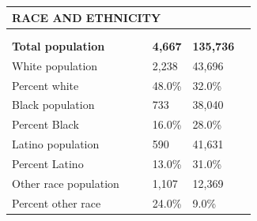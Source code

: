 \documentclass[9pt]{report}
\begin{document}
\vspace{12pt}
\setlength{\tabcolsep}{.01in} %
\begin{tabular}{p{.10in}p{.10in}p{.10in}p{3.7in}>{\hfill}p{.85in}>{\hfill}p{.85in}>{\hfill}p{.85in}>{\hfill}p{.85in}p{0.1in}}
\multicolumn{9}{l}{\parbox{7.1in}{\raggedright{\large{\strut\textbf{RACE AND ETHNICITY}\strut}}}} \\ 
\hline
\multicolumn{4}{l}{\parbox{3.5in}{\raggedright{\textbf{}}}} & \multicolumn{1}{r}{\parbox{.85in}{\strut\raggedleft{\textbf{}\strut}}} & \multicolumn{1}{r}{\parbox{.85in}{\strut\raggedleft{\textbf{}\strut}}} & \multicolumn{1}{r}{\parbox{.85in}{\strut{}}} & \multicolumn{1}{r}{\parbox{.85in}{\strut{}}} & \\ 
\multicolumn{9}{l}{} \\ 
\multicolumn{4}{l}{\parbox{3.5in}{\strut\raggedright{\textbf{Total population}\strut}}} & \textbf{} & \textbf{} & \textbf{4,667} & \textbf{135,736} & \textbf{} \\ 
\multicolumn{4}{l}{\parbox{3.6in}{\strut\raggedright{{White population}}\strut}} &  &  & 2,238 & 43,696 & \multicolumn{1}{l}{}  \\ 
\multicolumn{4}{l}{\parbox{3.6in}{\strut\raggedright{{Percent white}}\strut}} &  &  & 48.0\% & 32.0\% & \multicolumn{1}{l}{}  \\ 
\multicolumn{4}{l}{\parbox{3.6in}{\strut\raggedright{{Black population}}\strut}} &  &  & 733 & 38,040 & \multicolumn{1}{l}{}  \\ 
\multicolumn{4}{l}{\parbox{3.6in}{\strut\raggedright{{Percent Black}}\strut}} &  &  & 16.0\% & 28.0\% & \multicolumn{1}{l}{}  \\ 
\multicolumn{4}{l}{\parbox{3.6in}{\strut\raggedright{{Latino population}}\strut}} &  &  & 590 & 41,631 & \multicolumn{1}{l}{}  \\ 
\multicolumn{4}{l}{\parbox{3.6in}{\strut\raggedright{{Percent Latino}}\strut}} &  &  & 13.0\% & 31.0\% & \multicolumn{1}{l}{}  \\ 
\multicolumn{4}{l}{\parbox{3.6in}{\strut\raggedright{{Other race population}}\strut}} &  &  & 1,107 & 12,369 & \multicolumn{1}{l}{}  \\ 
\multicolumn{4}{l}{\parbox{3.6in}{\strut\raggedright{{Percent other race}}\strut}} &  &  & 24.0\% & 9.0\% & \multicolumn{1}{l}{}  \\ 

\end{tabular}
\setlength{\tabcolsep}{6pt} %
\end{document}
